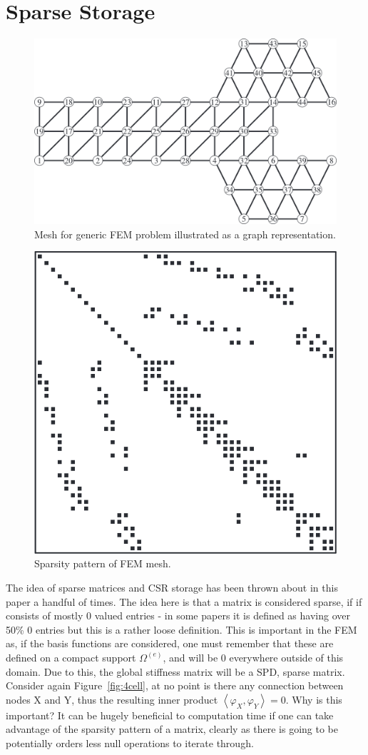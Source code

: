 \section{Sparse Storage}\label{sparse}

\begin{figure}
	\centering
	\includegraphics[width=0.7\linewidth]{Figures/mesh_graph}
	\caption{Mesh for generic FEM problem illustrated as a graph representation.}
	\label{fig:graph}
\end{figure}
\begin{figure}
	\centering
	\includegraphics[width=0.4\linewidth]{Figures/sparsity_pattern}
	\caption{Sparsity pattern of FEM mesh.}
	\label{fig:pattern}
\end{figure}

The idea of sparse matrices and CSR storage has been thrown about in this paper a handful of times. The idea here is that a matrix is considered sparse, if if consists of mostly 0 valued entries - in some papers it is defined as having over 50\% 0 entries but this is a rather loose definition. This is important in the FEM as, if the basis functions are considered, one must remember that these are defined on a compact support $\Omega^{(e)}$, and will be 0 everywhere outside of this domain. Due to this, the global stiffness matrix will be a SPD, sparse matrix. Consider again Figure~\ref{fig:4cell}, at no point is there any connection between nodes X and Y, thus the resulting inner product $\left\langle\varphi_X,\varphi_Y\right\rangle=0$. Why is this important? It can be hugely beneficial to computation time if one can take advantage of the sparsity pattern of a matrix, clearly as there is going to be potentially orders less null operations to iterate through.

